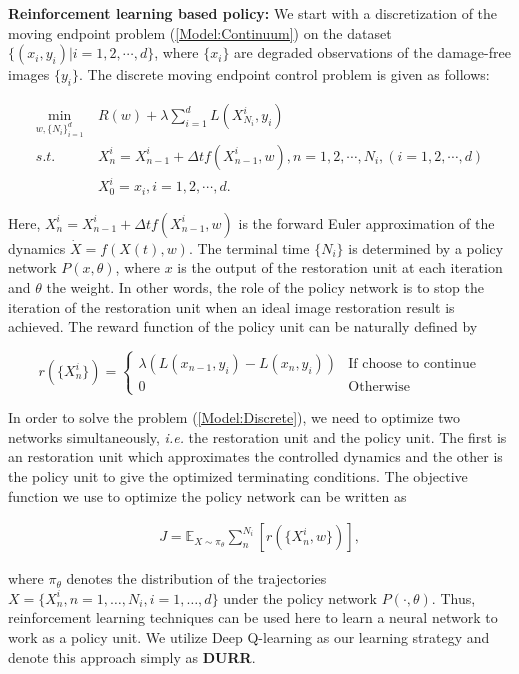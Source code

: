 \documentclass{article} %
\begin{document}
\textbf{Reinforcement learning based policy:} We start with a discretization of the moving endpoint problem
(\ref{Model:Continuum}) on the dataset $\{(x_i,y_i)|i=1, 2, \cdots, d\}$,
where $\{x_i\}$ are degraded observations of the damage-free images $\{y_i\}$.
The discrete moving endpoint control problem is given as follows:
	
\begin{align}
\min_{w,\{N_i\}_{i=1}^d} &\ R(w) + \lambda \sum_{i=1}^{d} L(X_{N_i}^i,y_i)\nonumber \\
s.t.&\ X_n^i = X_{n-1}^i+\Delta t f(X_{n-1}^i,w), n = 1, 2, \cdots, N_i, (i = 1, 2, \cdots, d)\\
&\ X_0^i = x_i, i = 1, 2, \cdots, d .\nonumber
\end{align}\label{Model:Discrete}
	
Here, $X_n^i = X_{n-1}^i+\Delta t f(X_{n-1}^i,w)$ is the
forward Euler approximation of the dynamics $\dot{X}=f(X(t),w)$. The terminal time $\{N_i\}$ is determined by
a policy network $P(x,\theta)$, where $x$ is the output of
the restoration unit at each iteration and $\theta$ the weight.
In other words, the role of the policy network is to stop the iteration of
the restoration unit when an ideal image restoration result is achieved.
The reward function of the policy unit can be naturally defined by

\begin{equation}
r(\{X_n^i\}) =  \left\{
\begin{array}{lr}
\lambda \left(L(x_{n-1},y_i)-L(x_n,y_i)\right)&\text{If choose to continue}\\
0& \text{Otherwise}
\end{array}
\right.
\label{rewardfunc}
\end{equation}

In order to solve the problem (\ref{Model:Discrete}),
we need to optimize two networks simultaneously, \textit{i.e.} the restoration unit
and the policy unit. The first is an restoration unit which approximates
the controlled dynamics and the other is the policy unit to give
the optimized terminating conditions. The objective function we use
to optimize the policy network can be written as

\begin{align}
J = \mathbb{E}_{X\sim \pi_\theta} \sum_{n}^{N_i}[r(\{X_n^i,w\})],
\end{align}

where $\pi_\theta$ denotes the distribution of
the trajectories $X=\{X^i_n,n=1,\ldots,N_i, i=1,\ldots,d\}$ under
the policy network $P(\cdot,\theta)$. Thus, reinforcement learning
techniques can be used here to learn a neural network to work as
a policy unit. We utilize Deep Q-learning \citep{mnih2015human}
as our learning strategy and denote this approach simply as \textbf{DURR}.
\end{document}
